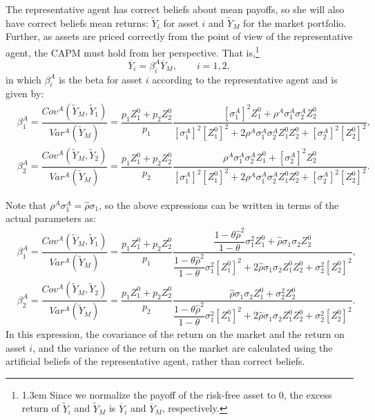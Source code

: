 \documentclass[10pt]{article}
\begin{document}
The representative agent has correct beliefs about mean payoffs, so she will also have correct beliefs mean returns: $ \tilde{Y}_i $ for asset $i$ and $ \tilde{Y}_M $ for the market portfolio. Further, as assets are priced correctly from the point of view of the representative agent, the CAPM must hold from her perspective. That is,\footnote{\baselineskip1.3em Since we normalize the payoff of the risk-free asset to 0, the excess return of $ \tilde{Y}_i $ and $ \tilde{Y}_M $ is $ \overline{Y}_i $ and $ \overline{Y}_M $, respectively.}
\begin{equation}
\overline{Y}_i = \beta_i^A \overline{Y}_M, \qquad i = 1, 2,
\end{equation}
in which $ \beta_i^A $ is the beta for asset $i$ according to the representative agent and is given by:
\begin{eqnarray*}
& \beta_1^A = \dfrac{Cov^A (\tilde{Y}_M, \tilde{Y}_1)}{Var^A (\tilde{Y}_M)} = \dfrac{p_1 Z_1^0 + p_2 Z_2^0}{p_1} \dfrac{\left[ \sigma_1^A \right]^2 Z_1^0 + \rho^A \sigma_1^A \sigma_2^A Z_2^0}{\left[ \sigma_1^A \right]^2 \left[ Z_1^0 \right]^2 + 2 \rho^A \sigma_1^A \sigma_2^A Z_1^0 Z_2^0 + \left[ \sigma_2^A \right]^2 \left[ Z_2^0 \right]^2}, & \\
& \beta_2^A = \dfrac{Cov^A (\tilde{Y}_M, \tilde{Y}_2)}{Var^A (\tilde{Y}_M)} = \dfrac{p_1 Z_1^0 + p_2 Z_2^0}{p_2} \dfrac{\rho^A \sigma_1^A \sigma_2^A Z_1^0 + \left[ \sigma_2^A \right]^2 Z_2^0}{\left[ \sigma_1^A \right]^2 \left[ Z_1^0 \right]^2 + 2 \rho^A \sigma_1^A \sigma_2^A Z_1^0 Z_2^0 + \left[ \sigma_2^A \right]^2 \left[ Z_2^0 \right]^2}. &
\end{eqnarray*}

Note that $ \rho^A \sigma_1^A = \hat{\rho} \sigma_1 $, so the above expressions can be written in terms of the actual parameters as:
\begin{eqnarray*}
& \beta_1^A = \dfrac{Cov^A (\tilde{Y}_M, \tilde{Y}_1)}{Var^A (\tilde{Y}_M)} = \dfrac{p_1 Z_1^0 + p_2 Z_2^0}{p_1} \dfrac{\dfrac{1 - \theta \hat{\rho}^2}{1 - \theta} \sigma_1^2 Z_1^0 + \hat{\rho} \sigma_1 \sigma_2 Z_2^0}{\dfrac{1 - \theta \hat{\rho}^2}{1 - \theta} \sigma_1^2 \left[ Z_1^0 \right]^2 + 2 \hat{\rho} \sigma_1 \sigma_2 Z_1^0 Z_2^0 + \sigma_2^2 \left[ Z_2^0 \right]^2}, & \\
& \beta_2^A = \dfrac{Cov^A (\tilde{Y}_M, \tilde{Y}_2)}{Var^A (\tilde{Y}_M)} = \dfrac{p_1 Z_1^0 + p_2 Z_2^0}{p_2}
\dfrac{\hat{\rho} \sigma_1 \sigma_2 Z_1^0 + \sigma_2^2 Z_2^0}{\dfrac{1 - \theta \hat{\rho}^2}{1 - \theta} \sigma_1^2 \left[ Z_1^0 \right]^2 + 2 \hat{\rho} \sigma_1 \sigma_2 Z_1^0 Z_2^0 + \sigma_2^2 \left[ Z_2^0 \right]^2}. &
\end{eqnarray*}
In this expression, the covariance of the return on the market and the return on asset $i$, and the variance of the return on the market are calculated using the artificial beliefs of the representative agent, rather than correct beliefs.
\end{document}
